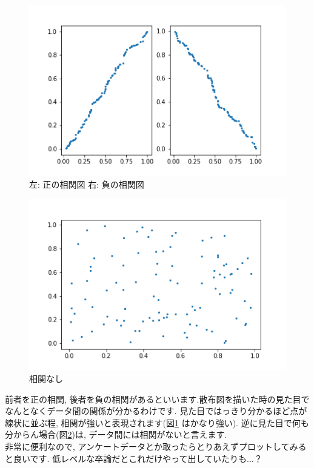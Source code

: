 \documentclass[11pt,a4paper]{jreport}
\begin{document}
\begin{figure}[H]
\label{im:scatter1}
  \centering
  \includegraphics[width=120mm,bb=0 0 432 288]{figures/scatter1.png}
  \caption{左: 正の相関図 右: 負の相関図}
\end{figure}

\begin{figure}[H]
\label{im:scatter2}
  \centering
  \includegraphics[width=120mm,bb=0 0 432 288]{figures/scatter2.png}
  \caption{相関なし}
\end{figure}

前者を正の相関, 後者を負の相関があるといいます.散布図を描いた時の見た目でなんとなくデータ間の関係が分かるわけです. 見た目ではっきり分かるほど点が線状に並ぶ程, 相関が強いと表現されます(図\ref{im:scatter1} はかなり強い). 逆に見た目で何も分からん場合(図\ref{im:scatter2})は, データ間には相関がないと言えます. \\
非常に便利なので, アンケートデータとか取ったらとりあえずプロットしてみると良いです. 低レベルな卒論だとこれだけやって出していたりも...？\\
\\
\end{document}
